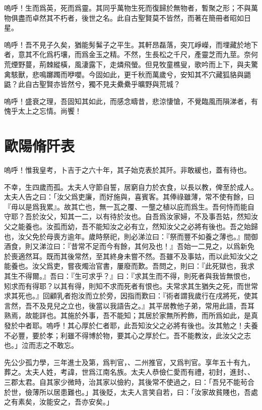嗚呼！生而爲英，死而爲靈。其同乎萬物生死而復歸於無物者，暫聚之形；不與萬物俱盡而卓然其不朽者，後世之名。此自古聖賢莫不皆然，而著在簡冊者昭如日星。

嗚呼！吾不見子久矣，猶能髣髴子之平生。其軒昂磊落，突兀崢嶸，而埋藏於地下者，意其不化爲朽壤，而爲金玉之精。不然，生長松之千尺，產靈芝而九莖。奈何荒煙野蔓，荊棘縱橫，風淒露下，走燐飛螢。但見牧童樵叟，歌吟而上下，與夫驚禽駭獸，悲鳴躑躅而咿嚶。今固如此，更千秋而萬歲兮，安知其不穴藏狐貉與鼯鼪？此自古聖賢亦皆然兮，獨不見夫纍纍乎曠野與荒城？

嗚呼！盛衰之理，吾固知其如此，而感念疇昔，悲涼悽愴，不覺臨風而隕涕者，有愧{乎}太上之忘情。尚饗！

\theendnotes 

\section[瀧岡阡表\quad{\small 歐陽脩}]{{\normalsize 歐陽脩}\quad {}阡表}
嗚呼！惟我皇考，卜吉于之六十年，其子始克表於其阡。非敢緩也，蓋有待也。

不幸，生四歲而孤。太夫人守節自誓，居窮自力於衣食，以長以教，俾至於成人。太夫人告之曰：「汝父爲吏廉，而好施與，喜賓客。其俸祿雖薄，常不使有餘，曰『毋以是爲我累』。故其亡也，無一瓦之覆、一壟之植以庇而爲生。吾何恃而能自守耶？吾於汝父，知其一二，以有待於汝也。自吾爲汝家婦，不及事吾姑，然知汝父之能養也。汝孤而幼，吾不能知汝之必有立，然知汝父之必將有後也。吾之始歸也，汝父免於母喪方逾年。歲時祭祀，則必涕泣曰：『祭而豐不如養之薄也。』間御酒食，則又涕泣曰：『昔常不足而今有餘，其何及也！』吾始一二見之，以爲新免於喪適然耳。既而其後常然，至其終身未嘗不然。吾雖不及事姑，而以此知汝父之能養也。汝父爲吏，嘗夜燭治官書，屢廢而歎。吾問之，則曰：『此死獄也，我求其生不得爾。』吾曰：『生可求乎？』曰：『求其生而不得，則死者與我皆無恨也，矧求而有得耶？以其有得，則知不求而死者有恨也。夫常求其生猶失之死，而世常求其死也。』回顧乳者抱汝而立於旁，因指而歎曰：『術者謂我歲行在戌將死，使其言然，吾不及見兒之立也，後當以我語告之。』其平居教他子弟，常用此語，吾耳熟焉，故能詳也。其施於外事，吾不能知；其居於家無所矜飾，而所爲如此，是真發於中者耶。嗚呼！其心厚於仁者耶，此吾知汝父之必將有後也。汝其勉之！夫養不必豐，要於孝；利雖不得博於物，要其心之厚於仁。吾不能教汝，此汝父之志也。」泣而志之不敢忘。

先公少孤力學，三年進士及第，爲判官，、二州推官，又爲判官。享年五十有九，葬之。太夫人姓，考諱，世爲江南名族。太夫人恭儉仁愛而有禮，初封，進封、、三郡太君。自其家少微時，治其家以儉約，其後常不使過之，曰：「吾兒不能茍合於世，儉薄所以居患難也。」其後貶，太夫人言笑自若，曰：「汝家故貧賤也，吾處之有素矣，汝能安之，吾亦安矣。」

